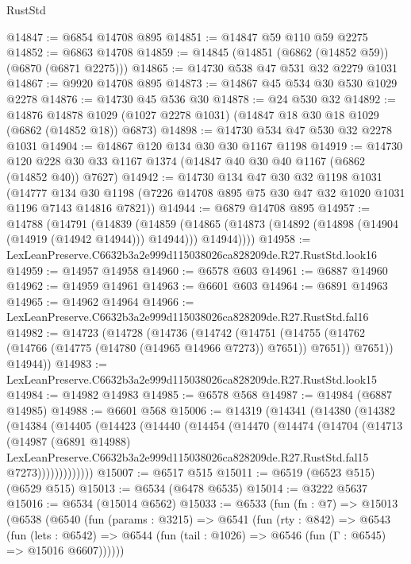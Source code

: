 \begin{lexlean}{RustStd}
\begin{coremodule}
@14847 := @6854 @14708 @895
@14851 := @14847 @59 @110 @59 @2275
@14852 := @6863 @14708
@14859 := @14845 (@14851 (@6862 (@14852 @59)) (@6870 (@6871 @2275)))
@14865 := @14730 @538 @47 @531 @32 @2279 @1031
@14867 := @9920 @14708 @895
@14873 := @14867 @45 @534 @30 @530 @1029 @2278
@14876 := @14730 @45 @536 @30
@14878 := @24 @530 @32
@14892 := @14876
    @14878
    @1029
    (@1027 @2278 @1031)
    (@14847 @18 @30 @18 @1029 (@6862 (@14852 @18)) @6873)
@14898 := @14730 @534 @47 @530 @32 @2278 @1031
@14904 := @14867 @120 @134 @30 @30 @1167 @1198
@14919 := @14730 @120 @228 @30 @33 @1167 @1374 (@14847 @40 @30 @40 @1167 (@6862 (@14852 @40)) @7627)
@14942 := @14730
    @134
    @47
    @30
    @32
    @1198
    @1031
    (@14777 @134 @30 @1198 (@7226 @14708 @895 @75 @30 @47 @32 @1020 @1031 @1196 @7143 @14816 @7821))
@14944 := @6879 @14708 @895
@14957 := @14788
    (@14791
      (@14839
        (@14859
          (@14865 (@14873 (@14892 (@14898 (@14904 (@14919 (@14942 @14944))) @14944))) @14944))))
@14958 := LexLeanPreserve.C6632b3a2e999d115038026ca828209de.R27.RustStd.look16
@14959 := @14957 @14958
@14960 := @6578 @603
@14961 := @6887 @14960
@14962 := @14959 @14961
@14963 := @6601 @603
@14964 := @6891 @14963
@14965 := @14962 @14964
@14966 := LexLeanPreserve.C6632b3a2e999d115038026ca828209de.R27.RustStd.fal16
@14982 := @14723
    (@14728
      (@14736
        (@14742
          (@14751
            (@14755 (@14762 (@14766 (@14775 (@14780 (@14965 @14966 @7273)) @7651)) @7651))
            @7651))
        @14944))
@14983 := LexLeanPreserve.C6632b3a2e999d115038026ca828209de.R27.RustStd.look15
@14984 := @14982 @14983
@14985 := @6578 @568
@14987 := @14984 (@6887 @14985)
@14988 := @6601 @568
@15006 := @14319
    (@14341
      (@14380
        (@14382
          (@14384
            (@14405
              (@14423
                (@14440
                  (@14454
                    (@14470
                      (@14474
                        (@14704
                          (@14713
                            (@14987
                              (@6891 @14988)
                              LexLeanPreserve.C6632b3a2e999d115038026ca828209de.R27.RustStd.fal15
                              @7273)))))))))))))
@15007 := @6517 @515
@15011 := @6519 (@6523 @515) (@6529 @515)
@15013 := @6534 (@6478 @6535)
@15014 := @3222 @5637
@15016 := @6534 (@15014 @6562)
@15033 := @6533
    (fun (fn : @7) =>
    @15013
      (@6538
        (@6540
          (fun (params : @3215) =>
          @6541
            (fun (rty : @842) =>
            @6543
              (fun (lets : @6542) =>
              @6544 (fun (tail : @1026) => @6546 (fun (Γ : @6545) => @15016 @6607))))))

\end{coremodule}
\end{lexlean}

